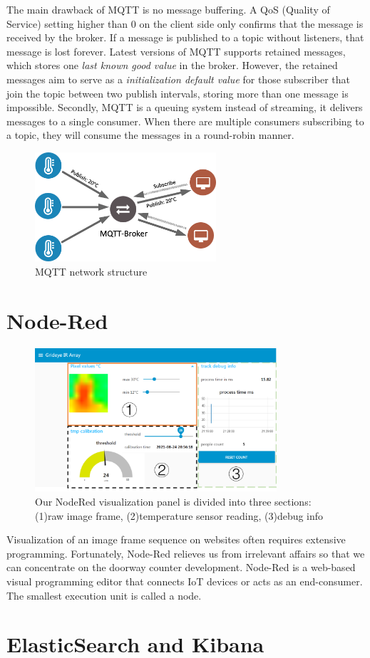 The main drawback of MQTT is no message buffering. A QoS (Quality of Service) setting higher than 0 on the client side only confirms that the message is received by the broker. If a message is published to a topic without listeners, that message is lost forever. Latest versions of MQTT supports retained messages, which stores one \emph{last known good value} in the broker. However, the retained messages aim to serve as a \emph{initialization default value} for those subscriber that join the topic between two publish intervals, storing more than one message is impossible. Secondly, MQTT is a queuing system instead of streaming, it delivers messages to a single consumer. When there are multiple consumers subscribing to a topic, they will consume the messages in a round-robin manner.
\begin{figure}
  \centering
  \includegraphics[width=0.6\textwidth]{figures/mqtt.png}
  \caption{MQTT network structure}\label{fig:mqtt}
\end{figure}
\section{Node-Red}
\begin{figure}
  \centering
  \includegraphics[width=0.8\textwidth]{figures/noderedui.png}
  \caption{Our NodeRed visualization panel is divided into three sections: (1)raw image frame, (2)temperature sensor reading, (3)debug info}\label{fig:nodered}
\end{figure}

Visualization of an image frame sequence on websites often requires extensive programming. Fortunately, Node-Red \cite{nodered} relieves us from irrelevant affairs so that we can concentrate on the doorway counter development. Node-Red is a web-based visual programming editor that connects IoT devices or acts as an end-consumer. The smallest execution unit is called a node.
%
\section{ElasticSearch and Kibana} 